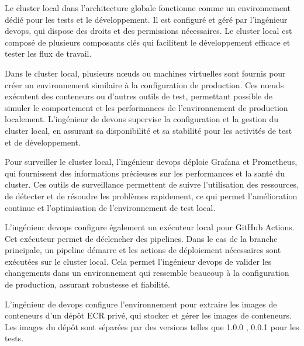  Le cluster local dans l’architecture globale fonctionne comme un environnement dédié pour les tests et le développement. Il est configuré et géré par l'ingénieur devops, qui dispose des droits et des permissions nécessaires. Le cluster local est composé de plusieurs composants clés qui facilitent le développement efficace et tester les flux de travail.     \\[0.02cm]
 \indent
 Dans le cluster local, plusieurs nœuds ou machines virtuelles sont fournis pour créer un environnement similaire à la configuration de production. Ces nœuds exécutent des conteneurs ou d’autres outils de test, permettant possible de simuler le comportement et les performances de l’environnement de production localement. L’ingénieur de devons supervise la configuration et la gestion du cluster local, en assurant sa disponibilité et sa stabilité pour les activités de test et de développement.\\[0.02cm]
 \indent
 Pour surveiller le cluster local, l’ingénieur devops déploie Grafana et Prometheus, qui fournissent des informations précieuses sur les performances et la santé du cluster. Ces outils de surveillance permettent de suivre l’utilisation des ressources, de détecter et de résoudre les problèmes rapidement, ce qui permet l’amélioration continue et l’optimisation de l’environnement de test local.\\[0.02cm]
 \indent
 L’ingénieur devops configure également un exécuteur local pour GitHub Actions. Cet exécuteur permet de déclencher des pipelines. Dans le cas de la branche principale, un pipeline démarre et les actions de déploiement nécessaires sont exécutées sur le cluster local. Cela permet l'ingénieur devops de valider les changements dans un environnement qui ressemble beaucoup à la configuration de production, assurant robustesse et fiabilité.
 \\[0.02cm]
 \indent
L’ingénieur de devops configure l’environnement pour extraire les images de conteneurs d’un dépôt ECR privé, qui stocker et gérer les images de conteneurs. Les images du dépôt sont séparées par des versions telles que 1.0.0 , 0.0.1 pour les tests.
 
